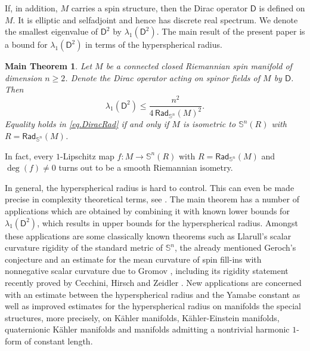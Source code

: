 \documentclass[11pt,reqno]{amsart}
\newcommand{\RadSn}{\mathsf{Rad}_{\Sn}}
\newcommand{\Sn}{\mathbb{S}^n}
\newcommand{\D}{\mathsf{D}}
\newcommand{\<}{\langle}
\renewcommand{\>}{\rangle}
\newtheorem*{maintheorem}{Main Theorem}
\theoremstyle{definition}
\begin{document}
If, in addition, $M$ carries a spin structure, then the Dirac operator $\D$ is defined on $M$.
It is elliptic and selfadjoint and hence has discrete real spectrum.
We denote the smallest eigenvalue of $\D^2$ by $\lambda_1(\D^2)$.
The main result of the present paper is a bound for $\lambda_1(\D^2)$ in terms of the hyperspherical radius.

\begin{maintheorem}
Let $M$ be a connected closed Riemannian spin manifold of dimension $n\ge2$.
Denote the Dirac operator acting on spinor fields of $M$ by $\D$.
Then
\begin{equation}
\lambda_1(\D^2) \le \frac{n^2}{4\,\RadSn(M)^2}.
\label{eq.DiracRad}
\end{equation}
Equality holds in \eqref{eq.DiracRad} if and only if $M$ is isometric to $\Sn(R)$ with $R=\RadSn(M)$.
\end{maintheorem}

In fact, every $1$-Lipschitz map $f\colon M\to \Sn(R)$ with $R=\RadSn(M)$ and $\deg(f)\neq0$ turns out to be a smooth Riemannian isometry.

In general, the hyperspherical radius is hard to control.
This can even be made precise in complexity theoretical terms, see \cite{BGM}.
The main theorem has a number of applications which are obtained by combining it with known lower bounds for $\lambda_1(\D^2)$, which results in upper bounds for the hyperspherical radius.
Amongst these applications are some classically known theorems such as Llarull's scalar curvature rigidity of the standard metric of $\Sn$, the already mentioned Geroch's conjecture and an estimate for the mean curvature of spin fill-ins with nonnegative scalar curvature due to Gromov \cite{G4}, including its rigidity statement recently proved by Cecchini, Hirsch and Zeidler \cite{CHZ}.
New applications are concerned with an estimate between the hyperspherical radius and the Yamabe constant as well as improved estimates for the hyperspherical radius on manifolds the special structures, more precisely, on Kähler manifolds, Kähler-Einstein manifolds, quaternionic Kähler manifolds and manifolds admitting a nontrivial harmonic $1$-form of constant length. 
\end{document}
